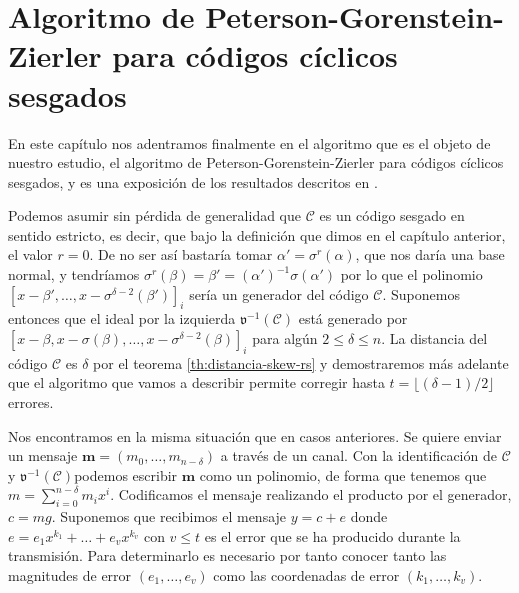 \chapter[Algoritmo PGZ para códigos cíclicos sesgados]{Algoritmo de Peterson-Gorenstein-Zierler para códigos cíclicos sesgados}

En este capítulo nos adentramos finalmente en el algoritmo que es el objeto de nuestro estudio, el algoritmo de Peterson-Gorenstein-Zierler para códigos cíclicos sesgados, y es una exposición de los resultados descritos en \parencite{gomez-torrecillas_petersongorensteinzierler_2018}.

Podemos asumir sin pérdida de generalidad que  \(\mathcal C\) es un código  sesgado en sentido estricto, es decir, que bajo la definición que dimos en el capítulo anterior, el valor \(r = 0\).
De no ser así bastaría tomar \(\alpha' = \sigma^r(\alpha)\), que nos daría una base normal, y tendríamos \(\sigma^r(\beta) = \beta' = (\alpha')^{-1}\sigma(\alpha')\) por lo que el polinomio \([x - \beta', \dots, x - \sigma^{\delta - 2}(\beta')]_i\) sería un generador del código \(\mathcal C\).
Suponemos entonces que el ideal por la izquierda \(\mathfrak v^{-1}(\mathcal C)\) está generado por \([x - \beta, x - \sigma(\beta), \dots, x - \sigma^{\delta - 2}(\beta)]_i\) para algún \(2 \leq \delta \leq n\).
La distancia del código \(\mathcal C\) es \(\delta\) por el teorema \ref{th:distancia-skew-rs} y demostraremos más adelante que el algoritmo que vamos a describir permite corregir hasta \(t = \lfloor (\delta - 1)/2 \rfloor\) errores.

Nos encontramos en la misma situación que en casos anteriores.
Se quiere enviar un mensaje \(\mathbf{m} = (m_0, \dots, m_{n - \delta})\) a través de un canal.
Con la identificación de \(\mathcal C\) y \(\mathfrak v^{-1}(\mathcal C)\)podemos escribir \(\mathbf{m}\) como un polinomio, de forma que tenemos que \(m = \sum_{i=0}^{n-\delta}m_ix^{i}\).
Codificamos el mensaje realizando el producto por el generador, \(c = mg\).
Suponemos que recibimos el mensaje \(y = c + e\) donde \(e = e_1x^{k_1} + \dots + e_vx^{k_v}\) con \(v \leq t\) es el error que se ha producido durante la transmisión.
Para determinarlo es necesario por tanto conocer tanto las magnitudes de error \((e_{1}, \dots, e_{v})\) como las coordenadas de error \((k_1, \dots, k_v)\).

